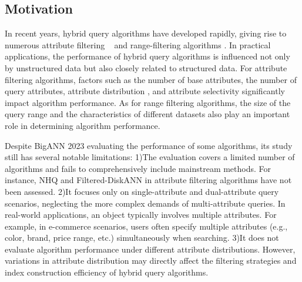 \documentclass[sigconf, nonacm]{acmart}
\begin{document}
\begin{sloppypar}
\subsection{Motivation}
In recent years, hybrid query algorithms have developed rapidly, giving rise to numerous attribute filtering ~\cite{NHQ,diskann} and range-filtering algorithms \cite{serf,iRangeGraph}. In practical applications, the performance of hybrid query algorithms is influenced not only by unstructured data but also closely related to structured data. For attribute filtering algorithms, factors such as the number of base attributes, the number of query attributes, attribute distribution \cite{UNG}, and attribute selectivity \cite{ACORN} significantly impact algorithm performance. As for range filtering algorithms, the size of the query range and the characteristics of different datasets also play an important role in determining algorithm performance.


Despite BigANN 2023 \cite{bigann2023}  evaluating the performance of some algorithms, its study still has several notable limitations:
1)The evaluation covers a limited number of algorithms and fails to comprehensively include mainstream methods. For instance, NHQ and Filtered-DiskANN in attribute filtering algorithms have not been assessed.
2)It focuses only on single-attribute and dual-attribute query scenarios, neglecting the more complex demands of multi-attribute queries. In real-world applications, an object typically involves multiple attributes. For example, in e-commerce scenarios, users often specify multiple attributes (e.g., color, brand, price range, etc.) simultaneously when searching.
3)It does not evaluate algorithm performance under different attribute distributions. However, variations in attribute distribution may directly affect the filtering strategies and index construction efficiency of hybrid query algorithms.


\end{sloppypar}
\end{document}
